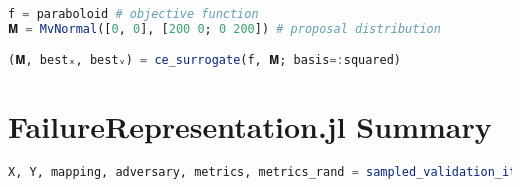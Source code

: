 \begin{lstlisting}[language=Julia]
f = paraboloid # objective function
𝐌 = MvNormal([0, 0], [200 0; 0 200]) # proposal distribution

(𝐌, bestₓ, bestᵥ) = ce_surrogate(f, 𝐌; basis=:squared)
\end{lstlisting}


\section{FailureRepresentation.jl Summary}

\begin{lstlisting}[language=Julia]
X, Y, mapping, adversary, metrics, metrics_rand = sampled_validation_iteration(T=10)
\end{lstlisting}